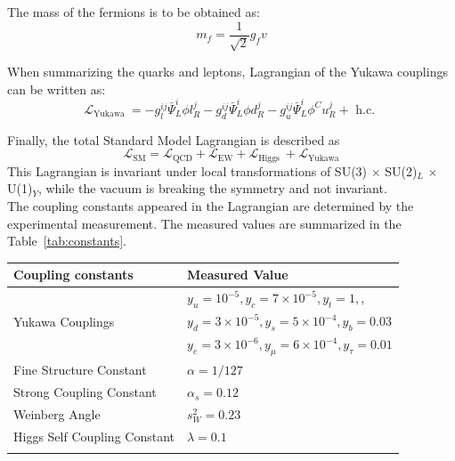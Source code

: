 The mass of the fermions is to be obtained as:
\begin{equation}
m_{f}=\frac{1}{\sqrt{2}} g_{f} v
\end{equation}

When summarizing the quarks and leptons, Lagrangian of the Yukawa couplings can be written as:
\begin{equation}
\mathcal{L}_{\text {Yukawa }}=-g_{l}^{i j} \bar{\Psi}_{L}^{i} \phi l_{R}^{j}-g_{d}^{i j} \bar{\Psi}_{L}^{i} \phi d_{R}^{j}-g_{u}^{i j} \bar{\Psi}_{L}^{i} \phi^{C} u_{R}^{j}+\text { h.c. }
\end{equation}

Finally, the total Standard Model Lagrangian is described as 
\begin{equation}
\mathcal{L}_{\mathrm{SM}}=\mathcal{L}_{\mathrm{QCD}}+\mathcal{L}_{\mathrm{EW}}+\mathcal{L}_{\text {Higgs }}+\mathcal{L}_{\text {Yukawa}}
\end{equation}
This Lagrangian is invariant under local transformations of SU(3) $\times$ SU(2)$_L$ $\times$ U(1)$_Y$, while the vacuum is breaking the symmetry and not invariant. \\

The coupling constants appeared in the Lagrangian are determined by the experimental measurement. 
The measured values are summarized in the Table~\ref{tab:constants}.  \\

\begin{center}
\begin{tabular}{|l|l|}
\hline
Coupling constants & Measured Value \\
\hline 
                             & $y_{u}=10^{-5}, y_{c}=7 \times 10^{-5}, y_{t}=1,$, \\
            Yukawa Couplings & $y_{d}=3 \times 10^{-5}, y_{s}=5 \times 10^{-4}, y_{b}=0.03$ \\
                             & $y_{e}=3 \times 10^{-6}, y_{\mu}=6 \times 10^{-4}, y_{\tau}=0.01$ \\
     Fine Structure Constant & $\alpha=1 / 127$ \\
    Strong Coupling Constant & $\alpha_{s}=0.12$ \\
              Weinberg Angle & $s_{W}^{2}=0.23$ \\
Higgs Self Coupling Constant & $\lambda=0.1$ \\
\hline
\label{tab:constants}
\caption{coupling constants~\cite{PhysRevD.98.030001}}
\end{tabular}
\end{center}

